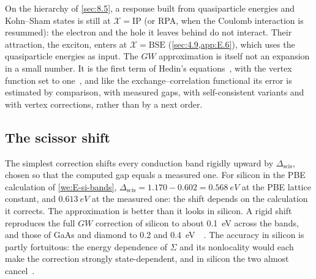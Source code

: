 On the hierarchy of \cref{sec:8.5}, a response built from quasiparticle energies and Kohn--Sham states is still at $\mathcal{X} = \mathrm{IP}$ (or RPA, when the Coulomb interaction is resummed): the electron and the hole it leaves behind do not interact. Their attraction, the exciton, enters at $\mathcal{X} = \mathrm{BSE}$ (\cref{sec:4.9,app:E.6}), which uses the quasiparticle energies as input. The $GW$ approximation is itself not an expansion in a small number. It is the first term of Hedin's equations~\cite{hedin1965new}, with the vertex function set to one~\cite[Eqs.~(43)--(46) and (60)]{aryasetiawan1998gw}, and like the exchange--correlation functional its error is estimated by comparison, with measured gaps, with self-consistent variants and with vertex corrections, rather than by a next order.

\subsection{The scissor shift}

The simplest correction shifts every conduction band rigidly upward by $\Delta_{\mathrm{scis}}$, chosen so that the computed gap equals a measured one. For silicon in the PBE calculation of \cref{we:E-si-bands}, $\Delta_{\mathrm{scis}} = 1.170 - 0.602 = \SI{0.568}{eV}$ at the PBE lattice constant, and $\SI{0.613}{eV}$ at the measured one: the shift depends on the calculation it corrects. The approximation is better than it looks in silicon. A rigid shift reproduces the full $GW$ correction of silicon to about \SI{0.1}{eV} across the bands, and those of GaAs and diamond to 0.2 and \SI{0.4}{eV}~\cite{godby1988self}~\cite[Sect.~V\,B]{aryasetiawan1998gw}. The accuracy in silicon is partly fortuitous: the energy dependence of $\Sigma$ and its nonlocality would each make the correction strongly state-dependent, and in silicon the two almost cancel~\cite[Sect.~V\,B]{aryasetiawan1998gw}.

